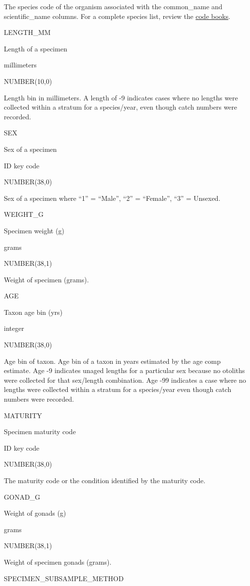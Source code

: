 \documentclass[
  letterpaper,
  oneside,
  open=any]{scrbook}
\begin{document}
The species code of the organism associated with the common\_name and
scientific\_name columns. For a complete species list, review the
\href{https://www.fisheries.noaa.gov/resource/document/groundfish-survey-species-code-manual-and-data-codes-manual}{code
books}.

LENGTH\_MM

Length of a specimen

millimeters

NUMBER(10,0)

Length bin in millimeters. A length of -9 indicates cases where no
lengths were collected within a stratum for a species/year, even though
catch numbers were recorded.

SEX

Sex of a specimen

ID key code

NUMBER(38,0)

Sex of a specimen where ``1'' = ``Male'', ``2'' = ``Female'', ``3'' =
Unsexed.

WEIGHT\_G

Specimen weight (g)

grams

NUMBER(38,1)

Weight of specimen (grams).

AGE

Taxon age bin (yrs)

integer

NUMBER(38,0)

Age bin of taxon. Age bin of a taxon in years estimated by the age comp
estimate. Age -9 indicates unaged lengths for a particular sex because
no otoliths were collected for that sex/length combination. Age -99
indicates a case where no lengths were collected within a stratum for a
species/year even though catch numbers were recorded.

MATURITY

Specimen maturity code

ID key code

NUMBER(38,0)

The maturity code or the condition identified by the maturity code.

GONAD\_G

Weight of gonads (g)

grams

NUMBER(38,1)

Weight of specimen gonads (grams).

SPECIMEN\_SUBSAMPLE\_METHOD
\end{document}
